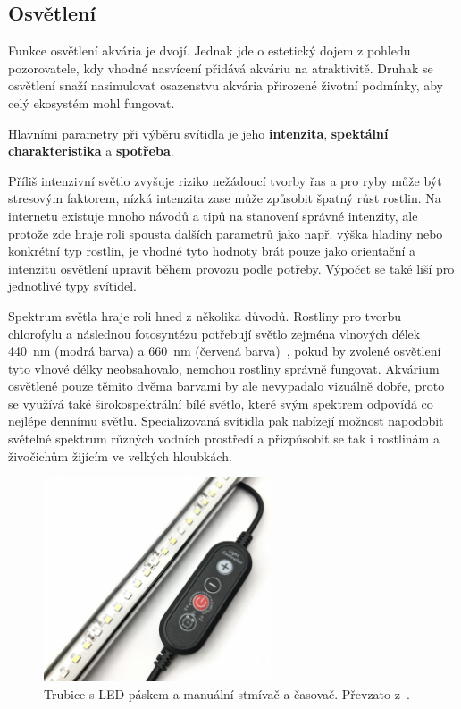    \subsection{Osvětlení}
        Funkce osvětlení akvária je dvojí. Jednak jde o estetický dojem z pohledu pozorovatele, kdy vhodné nasvícení přidává akváriu na atraktivitě. Druhak se osvětlení snaží nasimulovat osazenstvu akvária přirozené životní podmínky, aby celý ekosystém mohl fungovat.

        Hlavními parametry při výběru svítidla je jeho \textbf{intenzita}, \textbf{spektální charakteristika} a \textbf{spotřeba}. 
        
        Příliš intenzivní světlo zvyšuje riziko nežádoucí tvorby řas a pro ryby může být stresovým faktorem, nízká intenzita zase může způsobit špatný růst rostlin. Na internetu existuje mnoho návodů a tipů na stanovení správné intenzity, ale protože zde hraje roli spousta dalších parametrů jako např. výška hladiny nebo konkrétní typ rostlin, je vhodné tyto hodnoty brát pouze jako orientační a intenzitu osvětlení upravit během provozu podle potřeby. Výpočet se také liší pro jednotlivé typy svítidel. 

        Spektrum světla hraje roli hned z několika důvodů. Rostliny pro tvorbu chlorofylu a následnou fotosyntézu potřebují světlo zejména vlnových délek \qty{440}{nm} (modrá barva) a \qty{660}{nm} (červená barva)~\cite{eshop-ledsolution-svetlo}, pokud by zvolené osvětlení tyto vlnové délky neobsahovalo, nemohou rostliny správně fungovat. Akvárium osvětlené pouze těmito dvěma barvami by ale nevypadalo vizuálně dobře, proto se využívá také širokospektrální bílé světlo, které svým spektrem odpovídá co nejlépe dennímu světlu. 
        Specializovaná svítidla pak nabízejí možnost napodobit světelné spektrum různých vodních prostředí a přizpůsobit se tak i rostlinám a živočichům žijícím ve velkých hloubkách. 

 
        \begin{figure}[h!]
            \centering
            \includegraphics[width=0.6\textwidth]{obrazky/osvetleni/stmivac.jpg}
            \caption{Trubice s LED páskem a manuální stmívač a časovač. Převzato z~\cite{eshop-rostlinna-akvaria}.}
            \label{fig:obrazky-osvetleni-stmivac-jpg}
        \end{figure}

